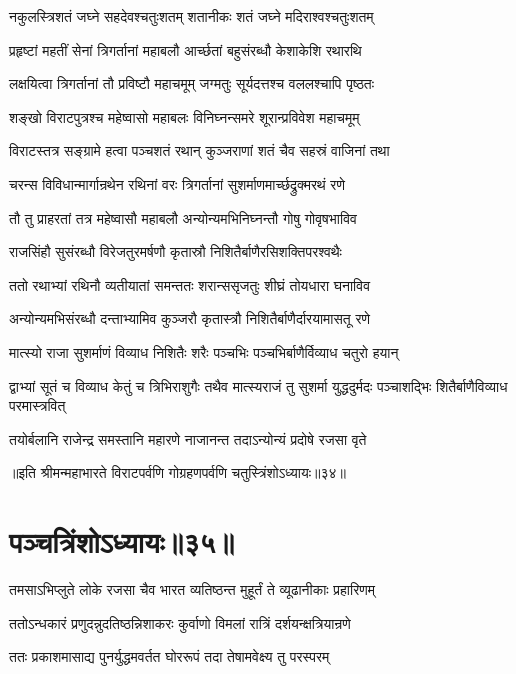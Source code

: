 \twolineshloka
{नकुलस्त्रिशतं जघ्ने सहदेवश्चतुःशतम्}
{शतानीकः शतं जघ्ने मदिराश्वश्चतुःशतम्}


\twolineshloka
{प्रहृष्टां महतीं सेनां त्रिगर्तानां महाबलौ}
{आर्च्छतां बहुसंरब्धौ केशाकेशि रथारथि}


\twolineshloka
{लक्षयित्वा त्रिगर्तानां तौ प्रविष्टौ महाचमूम्}
{जग्मतुः सूर्यदत्तश्च वललश्चापि पृष्ठतः}


\twolineshloka
{शङ्खो विराटपुत्रश्च महेष्वासो महाबलः}
{विनिघ्नन्समरे शूरान्प्रविवेश महाचमूम्}


\twolineshloka
{विराटस्तत्र सङ्ग्रामे हत्वा पञ्चशतं रथान्}
{कुञ्जराणां शतं चैव सहस्रं वाजिनां तथा}


\twolineshloka
{चरन्स विविधान्मार्गान्रथेन रथिनां वरः}
{त्रिगर्तानां सुशर्माणमार्च्छद्रुक्मरथं रणे}


\twolineshloka
{तौ तु प्राहरतां तत्र महेष्वासौ महाबलौ}
{अन्योन्यमभिनिघ्नन्तौ गोषु गोवृषभाविव}


\twolineshloka
{राजसिंहौ सुसंरब्धौ विरेजतुरमर्षणौ}
{कृतास्रौ निशितैर्बाणैरसिशक्तिपरश्वथैः}


\twolineshloka
{ततो रथाभ्यां रथिनौ व्यतीयातां समन्ततः}
{शरान्ससृजतुः शीघ्रं तोयधारा घनाविव}


\twolineshloka
{अन्योन्यमभिसंरब्धौ दन्ताभ्यामिव कुञ्जरौ}
{कृतास्त्रौ निशितैर्बाणैर्दारयामासतू रणे}


\twolineshloka
{मात्स्यो राजा सुशर्माणं विव्याध निशितैः शरैः}
{पञ्चभिः पञ्चभिर्बाणैर्विव्याध चतुरो हयान्}


\threelineshloka
{द्वाभ्यां सूतं च विव्याध केतुं च त्रिभिराशुगैः}
{तथैव मात्स्यराजं तु सुशर्मा युद्धदुर्मदः}
{पञ्चाशद्भिः शितैर्बाणैविव्याध परमास्त्रवित्}


\twolineshloka
{तयोर्बलानि राजेन्द्र समस्तानि महारणे}
{नाजानन्त तदाऽन्योन्यं प्रदोषे रजसा वृते}

॥इति श्रीमन्महाभारते विराटपर्वणि गोग्रहणपर्वणि चतुस्त्रिंशोऽध्यायः॥३४॥

\chapter{पञ्चत्रिंशोऽध्यायः॥३५॥}

\twolineshloka
{तमसाऽभिप्लुते लोके रजसा चैव भारत}
{व्यतिष्ठन्त मुहूर्तं ते व्यूढानीकाः प्रहारिणम्}


\twolineshloka
{ततोऽन्धकारं प्रणुदन्नुदतिष्ठन्निशाकरः}
{कुर्वाणो विमलां रात्रिं दर्शयन्क्षत्रियान्रणे}


\twolineshloka
{ततः प्रकाशमासाद्य पुनर्युद्धमवर्तत}
{घोररूपं तदा तेषामवेक्ष्य तु परस्परम्}


